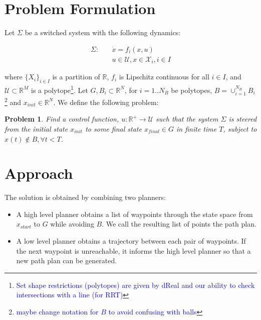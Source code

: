 \documentclass[12pt]{article}
\newtheorem{problem}{Problem}
\newcommand\fran[1]{\textcolor{blue}{#1}}
\newcommand\ffran[1]{\textcolor{blue}{\footnote{\fran{#1}}}}
\begin{document}
\section{Problem Formulation}
\label{sec:problem_formulation}

Let $\Sigma$ be a switched system with the following dynamics:

\begin{equation}
    \label{eq:sigma}
    \begin{split}
        \Sigma : \quad &\dot x = f_i(x, u) \\
                       &u \in \mathcal{U}, x \in \mathcal{X}_i, i \in I
    \end{split}
\end{equation}

where $\{X_i\}_{i \in I}$ is a partition of $\mathbb{R}$, $f_i$ is Lipschitz continuous for all $i \in I$, and $\mathcal{U} \subset \mathbb{R}^M$ is a polytope\ffran{Set shape restrictions (polytopes) are given by dReal and our ability to check intersections with a line (for RRT)}. Let $G, B_i \subset \mathbb{R}^N$, for $i = 1..N_B$ be polytopes, $B = \cup_{i=1}^{N_B} B_i$\ffran{maybe change notation for $B$ to avoid confusing with balls} and $x_{init} \in \mathbb{R}^N$. We define the following problem:

\begin{problem}\label{pr:reach}
Find a control function, $u : \mathbb{R}^+ \rightarrow \mathcal{U}$ such that the system $\Sigma$ is steered from the initial state $x_{init}$ to some final state $x_{final} \in G$ in finite time $T$, subject to $x(t) \notin B, \forall t < T$.
\end{problem}

\section{Approach}
\label{sec:approach}

The solution is obtained by combining two planners: 

\begin{itemize}
    \item A high level planner obtains a list of waypoints through the state space from $x_{start}$ to $G$ while avoiding $B$. We call the resulting list of points the path plan.
    \item A low level planner obtains a trajectory between each pair of waypoints. If the next waypoint is unreachable, it informs the high level planner so that a new path plan can be generated.
\end{itemize}
\end{document}
